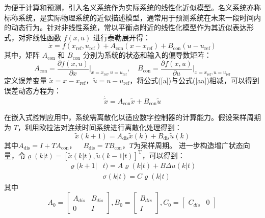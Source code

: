 \documentclass[lang=chs, degree=master, blindreview=false, winfonts=true]{yanputhesis}
\begin{document}
为便于计算和预测，引入名义系统作为实际系统的线性化近似模型。名义系统亦称标称系统，是实际物理系统的近似描述模型，通常用于预测系统在未来一段时间内的动态行为。针对非线性系统，常以平衡点附近的线性化模型作为其近似表达形式，对非线性函数 $f(x, u)$ 进行泰勒展开得：
\begin{equation}
	\dot{x} = f(x_\text{ref}, u_\text{ref}) + A_\text{con} (x - x_\text{ref}) + B_\text{con} (u - u_\text{ref})
	\label{a}
\end{equation}
其中，矩阵 $A_\text{con}$ 和 $B_\text{con}$ 分别为系统的状态和输入的偏导数矩阵：
\begin{equation}
	A_\text{con} = \frac{\partial f(x, u)}{\partial x} \bigg|_{x = x_\text{ref}, u = u_\text{ref}}, \quad B_\text{con} = \frac{\partial f(x, u)}{\partial u} \bigg|_{x = x_\text{ref}, u = u_\text{ref}}
\end{equation}
定义误差变量 $\tilde{x} = x - x_\text{ref}$，$\tilde{u} = u - u_\text{ref}$，将公式(\ref{a})与公式(\ref{aa})相减，可以得到误差动态方程为：
\begin{equation}
	\dot{\tilde{x}} = A_\text{con} \tilde{x} + B_\text{con} \tilde{u}
\end{equation}

在嵌入式控制应用中，系统需离散化以适应数字控制器的计算能力。假设采样周期为 $T$，利用欧拉法对连续时间系统进行离散化处理得到：
\begin{equation}
	\tilde{x}(k+1) = A_\text{dis} \tilde{x}(k) + B_\text{dis} \tilde{u}(k)
\end{equation}
其中$	A_\text{dis} = I + T A_\text{con}$，$ \quad B_\text{dis} = T B_\text{con}$，$T$为采样周期。
进一步构造增广状态向量，令$\varrho(k|t)=\left[\tilde{x}(k|t),\tilde{u}(k-1|t)\right]^\mathrm{T}$，可以得到：
\begin{equation}
	\begin{aligned}\varrho(k+1|&t)=A\varrho(k|t)+B\Delta u(k|t)\\&\sigma(k|t)=C\varrho(k|t)\end{aligned}
\end{equation}
其中
$$A_0=\begin{bmatrix}A_{dis}&B_{dis}\\0&I\end{bmatrix},B_0=\begin{bmatrix}B_{dis}\\I\end{bmatrix},C_0=\begin{bmatrix}C_{dis}&0\end{bmatrix}$$
\end{document}

